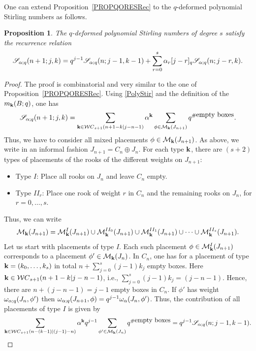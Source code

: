 \documentclass[10pt]{amsart}
\newtheorem{proposition}[theorem]{Proposition}%
\begin{document}
One can extend Proposition~\ref{PROPQORESRec} to the $q$-deformed polynomial Stirling numbers as follows.
\begin{proposition}\label{THRECPOLY} The $q$-deformed polynomial Stirling numbers of degree $s$ satisfy the recurrence relation 
\begin{equation}\label{RECPOLY}
{\mathscr S}_{{\bf \alpha};q}(n+1;j,k)=q^{j-1}{\mathscr S}_{{\bf \alpha};q}(n;j-1,k-1)+\sum_{r=0}^s \alpha_r [j-r]_q {\mathscr S}_{{\bf \alpha};q}(n;j-r,k).
\end{equation}
\end{proposition}
\begin{proof}
The proof is combinatorial and very similar to the one of Proposition~\ref{PROPQORESRec}. Using \eqref{PolyStir} and the definition of the $m_{{\bf k}}(B;q)$, one has
$$
{\mathscr S}_{{\bf \alpha};q}(n+1;j,k)=\sum_{{\bf k} \in {\mathcal WC}_{s+1}(n+1-k|j-n-1)}{\bf  \alpha}^{{\bf k}} \sum_{\phi \in {\mathcal M}_{{\bf k}}(J_{n+1})} q^{\# \mbox{empty boxes}}.
$$ 
Thus, we have to consider all mixed placements $\phi \in \mathcal{M}_{{\bf k}}(J_{n+1})$. As above, we write in an informal fashion $J_{n+1}=C_n \oplus J_n$. For each type ${\bf k}$, there are $(s+2)$ types of placements of the rooks of the different weights on $J_{n+1}$:
\begin{itemize}
\item Type $I$: Place all rooks on $J_n$ and leave $C_n$ empty.
\item Type $II_r$: Place one rook of weight $r$ in $C_n$ and the remaining rooks on $J_{n}$, for $r=0,\ldots,s$.
\end{itemize} 
Thus, we can write
$$
\mathcal{M}_{{\bf k}}(J_{n+1})=\mathcal{M}_{{\bf k}}^{I}(J_{n+1})\cup\mathcal{M}_{{\bf k}}^{II_0}(J_{n+1})\cup\mathcal{M}_{{\bf k}}^{II_1}(J_{n+1})\cup \cdots \cup\mathcal{M}_{{\bf k}}^{II_s}(J_{n+1}).
$$
Let us start with placements of type $I$. Each such placement  $\phi  \in \mathcal{M}_{{\bf k}}^{I}(J_{n+1})$ corresponds to a placement $\phi' \in \mathcal{M}_{{\bf k}}(J_{n})$. In $C_n$, one has for a placement of type ${\bf k}=(k_0,\ldots,k_s)$ in total $n+\sum_{j=0}^s(j-1)k_j$ empty boxes. Here ${\bf k}\in {\mathcal WC}_{s+1}(n+1-k|j-n-1)$, i.e., $\sum_{j=0}^s(j-1)k_j=(j-n-1)$. Hence, there are $n+(j-n-1)=j-1$ empty boxes in $C_n$. If $\phi'$ has weight $\omega_{{\bf \alpha};q}(J_n,\phi')$ then $\omega_{{\bf \alpha};q}(J_{n+1},\phi)=q^{j-1}\omega_{{\bf \alpha}}(J_n,\phi')$. Thus, the contribution of all placements of type $I$ is given by
$$
\sum_{{\bf k} \in {\mathcal WC}_{s+1}(n-(k-1)|(j-1)-n)}{\bf  \alpha}^{{\bf k}} q^{j-1}\sum_{\phi' \in {\mathcal M}_{{\bf k}}(J_{n})} q^{\# \mbox{empty boxes}} =q^{j-1}{\mathscr S}_{{\bf \alpha};q}(n;j-1,k-1).
$$
\end{proof}
\end{document}

